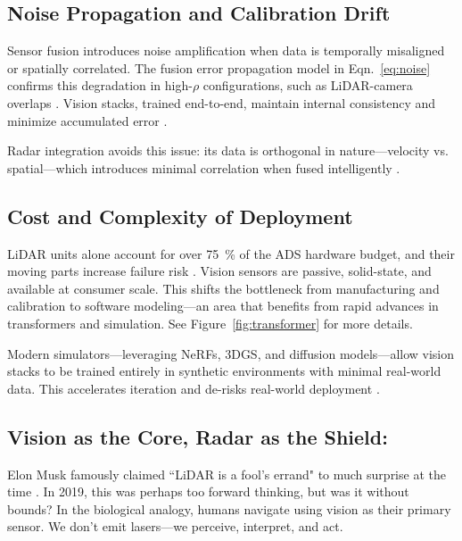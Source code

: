 \documentclass[12pt]{article}
\begin{document}
\subsection{Noise Propagation and Calibration Drift}

Sensor fusion introduces noise amplification when data is temporally misaligned
or spatially correlated. The fusion error propagation model in
Eqn.~\ref{eq:noise} confirms this degradation in high-$\rho$ configurations,
such as LiDAR-camera overlaps \autocite{Rana2023PerceptionSystems}. Vision
stacks, trained end-to-end, maintain internal consistency and minimize
accumulated error \cite{goff2025learningdriveworldmodel}.

Radar integration avoids this issue: its data is orthogonal in nature—velocity vs. spatial—which introduces minimal correlation when fused intelligently \autocite{Liao2024RadarVisionFusion}.

\subsection{Cost and Complexity of Deployment}

LiDAR units alone account for over \SI{75}{\percent} of the ADS hardware budget,
and their moving parts increase failure risk \autocite{Shetty2022LiDARvsCamera,
Sajjad2021ComparativeDetection}. Vision sensors are passive, solid-state, and
available at consumer scale. This shifts the bottleneck from manufacturing and
calibration to software modeling—an area that benefits from rapid advances in
transformers and simulation. See Figure~\ref{fig:transformer} for more details.

Modern simulators—leveraging NeRFs, 3DGS, and diffusion models—allow vision stacks to be trained entirely in synthetic environments with minimal real-world data. This accelerates iteration and de-risks real-world deployment \autocite{Haghighi2024}.

\subsection{Vision as the Core, Radar as the Shield:}

Elon Musk famously claimed ``LiDAR is a fool's errand" to much surprise at the
time \cite{TeslaAutonomyDay2019}. In 2019, this was perhaps too forward
thinking, but was it without bounds? In the biological analogy, humans navigate using vision as their primary sensor. We don’t emit lasers—we perceive, interpret, and act.
\end{document}
